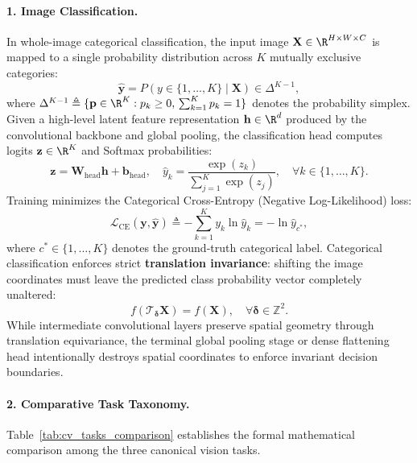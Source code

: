 \paragraph{1. Image Classification.}
In whole-image categorical classification, the input image $\mathbf{X} \in \R^{H \times W \times C}$ is mapped to a single probability distribution across $K$ mutually exclusive categories:
\begin{equation}
\hat{\mathbf{y}} = P(y \in \{1,\dots,K\} \mid \mathbf{X}) \in \Delta^{K-1},
\label{eq:image_classification_mapping}
\end{equation}
where $\Delta^{K-1} \triangleq \{\mathbf{p} \in \R^K : p_k \ge 0, \, \sum_{k=1}^K p_k = 1\}$ denotes the probability simplex. Given a high-level latent feature representation $\mathbf{h} \in \R^d$ produced by the convolutional backbone and global pooling, the classification head computes logits $\mathbf{z} \in \R^K$ and Softmax probabilities:
\begin{equation}
\mathbf{z} = \mathbf{W}_{\text{head}}\mathbf{h} + \mathbf{b}_{\text{head}}, \quad \hat{y}_k = \frac{\exp(z_k)}{\sum_{j=1}^K \exp(z_j)}, \quad \forall k \in \{1,\dots,K\}.
\label{eq:classification_softmax_logits}
\end{equation}
Training minimizes the Categorical Cross-Entropy (Negative Log-Likelihood) loss:
\begin{equation}
\mathcal{L}_{\text{CE}}(\mathbf{y}, \hat{\mathbf{y}}) \triangleq -\sum_{k=1}^K y_k \ln \hat{y}_k = -\ln \hat{y}_{c^*},
\label{eq:classification_cross_entropy}
\end{equation}
where $c^* \in \{1,\dots,K\}$ denotes the ground-truth categorical label. Categorical classification enforces strict \textbf{translation invariance}: shifting the image coordinates must leave the predicted class probability vector completely unaltered:
\begin{equation}
f\left( \mathcal{T}_{\boldsymbol{\delta}}\mathbf{X} \right) = f(\mathbf{X}), \quad \forall \boldsymbol{\delta} \in \mathbb{Z}^2.
\end{equation}
While intermediate convolutional layers preserve spatial geometry through translation equivariance, the terminal global pooling stage or dense flattening head intentionally destroys spatial coordinates to enforce invariant decision boundaries.

\paragraph{2. Comparative Task Taxonomy.}
Table~\ref{tab:cv_tasks_comparison} establishes the formal mathematical comparison among the three canonical vision tasks.


